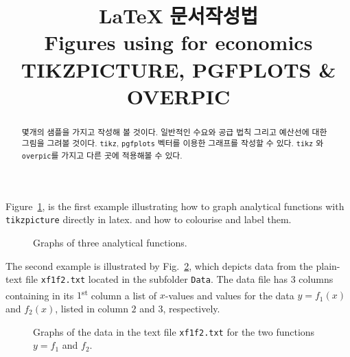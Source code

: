 \documentclass[10pt,a4paper]{article}
\begin{document}
	\title{\LaTeX \,\,문서작성법\\
        Figures using for economics\\ 
        TIKZPICTURE, PGFPLOTS \& OVERPIC}
	\maketitle


	\begin{abstract}
	몇개의 샘플을 가지고 작성해 볼 것이다. 일반적인 수요와 공급 법칙 그리고 예산선에 대한 그림을 그려볼 것이다. \texttt{tikz}, \texttt{pgfplots} 벡터를 이용한 그래프를 작성할 수 있다. \texttt{tikz} 와 \texttt{overpic}를 가지고 다른 곳에 적용해볼 수 있다.  
	\end{abstract}
	\vspace{0.5cm}\noindent
	Figure~\ref{fig:analytical}, is the first example illustrating how to graph analytical functions with \texttt{tikzpicture} directly in latex. and how to colourise and label them.
	\begin{figure}[!ht]
		\centering
		\caption{Graphs of three analytical functions.}
		\label{fig:analytical}
	\end{figure}
	
	The second example is illustrated by Fig.~\ref{fig:xf1f2}, which depicts data from the plain-text file \texttt{xf1f2.txt} located in the subfolder \texttt{Data}. The data file has $3$ columns containing in its $1$\textsuperscript{st} column a list of $x$-values and values for the data $y=f_1(x)$ and $f_2(x)$, listed in column $2$ and $3$, respectively.
	\begin{figure}[!ht]
		\centering
		\caption{Graphs of the data in the text file \texttt{xf1f2.txt} for the two functions $y=f_1$ and $f_2$.}
		\label{fig:xf1f2}
	\end{figure}
	
\end{document}
